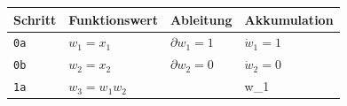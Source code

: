 \documentclass[
]{book}
\theoremstyle{definition}
\theoremstyle{definition}
\theoremstyle{definition}
\theoremstyle{definition}
\theoremstyle{remark}
\begin{document}
\begin{longtable}[]{@{}llll@{}}
\toprule
\begin{minipage}[b]{0.10\columnwidth}\raggedright
Schritt\strut
\end{minipage} & \begin{minipage}[b]{0.17\columnwidth}\raggedright
Funktionswert\strut
\end{minipage} & \begin{minipage}[b]{0.20\columnwidth}\raggedright
Ableitung\strut
\end{minipage} & \begin{minipage}[b]{0.41\columnwidth}\raggedright
Akkumulation\strut
\end{minipage}\tabularnewline
\midrule
\endhead
\begin{minipage}[t]{0.10\columnwidth}\raggedright
\texttt{0a}\strut
\end{minipage} & \begin{minipage}[t]{0.17\columnwidth}\raggedright
\(w_1=x_1\)\strut
\end{minipage} & \begin{minipage}[t]{0.20\columnwidth}\raggedright
\(\partial w_1=1\)\strut
\end{minipage} & \begin{minipage}[t]{0.41\columnwidth}\raggedright
\(\dot w_1 = 1\)\strut
\end{minipage}\tabularnewline
\begin{minipage}[t]{0.10\columnwidth}\raggedright
\texttt{0b}\strut
\end{minipage} & \begin{minipage}[t]{0.17\columnwidth}\raggedright
\(w_2=x_2\)\strut
\end{minipage} & \begin{minipage}[t]{0.20\columnwidth}\raggedright
\(\partial w_2=0\)\strut
\end{minipage} & \begin{minipage}[t]{0.41\columnwidth}\raggedright
\(\dot w_2 = 0\)\strut
\end{minipage}\tabularnewline
\begin{minipage}[t]{0.10\columnwidth}\raggedright
\texttt{1a}\strut
\end{minipage} & \begin{minipage}[t]{0.17\columnwidth}\raggedright
\(w_3 = w_1w_2\)\strut
\end{minipage} & \begin{minipage}[t]{0.20\columnwidth}\raggedright
\(\partial w_3 = \begin{bmatrix} w_2&w_1\end{bmatrix}\)\strut

\end{minipage}
\end{longtable}
\end{document}
